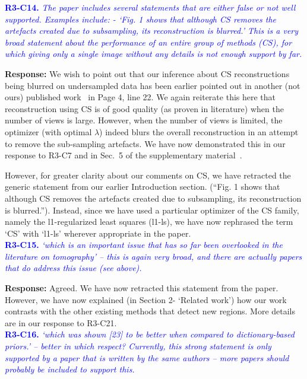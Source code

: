 \documentclass{article}
\begin{document}
\textcolor{blue}{\textbf{R3-C14.}\textit{ The paper includes several statements that are either false or not well supported. Examples include:    - `Fig. 1 shows that although CS removes the artefacts created due to subsampling, its reconstruction is blurred.' This is a very broad statement about the performance of an entire group of methods (CS), for which giving only a single image without any details is not enough support by far.}}

\textbf{Response:} We wish to point out that our inference about CS reconstructions being blurred on undersampled data has been earlier pointed out in another (not ours) published work~\cite{PICCS} in Page 4, line 22.  We again reiterate this here that reconstruction using CS is of good quality (as proven in literature) when the number of views is large. However, when the number of views is limited, the optimizer (with optimal $\lambda$) indeed blurs the overall reconstruction in an attempt to remove the sub-sampling artefacts. We have now demonstrated this in our response to R3-C7 and in Sec.~5 of the supplementary material~\cite{supp_paper}.

However, for greater clarity about our comments on CS, we have retracted the generic statement from our earlier Introduction section. (``Fig. 1 shows that although CS removes the artefacts created due to subsampling, its reconstruction is blurred.''). Instead, since we have used a particular optimizer of the CS family, namely the l1-regularized least squares (l1-ls), we have now rephrased the term `CS'  with `l1-ls' wherever appropriate in the paper.\\


\textcolor{blue}{\textbf{R3-C15.}\textit{ `which is an important issue that has so far been overlooked in the literature on tomography' -- this is again very broad, and there are actually papers that do address this issue (see above).}}

\textbf{Response:} Agreed. We have now retracted this statement from the paper. However, we have now explained (in Section 2- `Related work') how our work contrasts with the other existing methods that detect new regions. More details are in our response to R3-C21.\\
 
\textcolor{blue}{\textbf{R3-C16.}\textit{ `which was shown [23] to be better when compared to dictionary-based priors.' -- better in which respect? Currently, this strong statement is only supported by a paper that is written by the same authors -- more papers should probably be included to support this.}}
\end{document}
